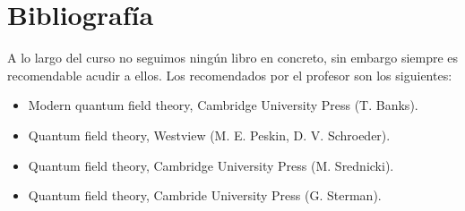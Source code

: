\documentclass[{../cc.tex}]{subfiles}
\begin{document}
\section*{Bibliografía}

A lo largo del curso no seguimos ningún libro en concreto, sin embargo siempre es recomendable acudir a ellos. Los recomendados por el profesor son los siguientes:


\begin{itemize}
	\item Modern quantum field theory, Cambridge University Press (T. Banks).
	\item Quantum field theory, Westview (M. E. Peskin, D. V. Schroeder).
	\item Quantum field theory, Cambridge University Press (M. Srednicki).
	\item Quantum field theory, Cambride University Press (G. Sterman).

\end{itemize}
\end{document}

